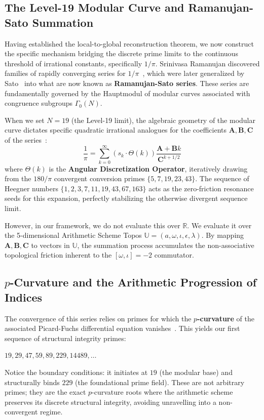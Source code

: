 \subsection{The Level-19 Modular Curve and Ramanujan-Sato Summation}
Having established the local-to-global reconstruction theorem, we now construct the specific mechanism bridging the discrete prime limits to the continuous threshold of irrational constants, specifically $1/\pi$. Srinivasa Ramanujan discovered families of rapidly converging series for $1/\pi$~\cite{Ramanujan1914}, which were later generalized by Sato~\cite{Sato2002} into what are now known as \textbf{Ramanujan-Sato series}. These series are fundamentally governed by the Hauptmodul of modular curves associated with congruence subgroups $\Gamma_0(N)$.

When we set $N=19$ (the Level-19 limit), the algebraic geometry of the modular curve dictates specific quadratic irrational analogues for the coefficients $\mathbf{A}, \mathbf{B}, \mathbf{C}$ of the series~\cite{Campbell2026}:
\begin{equation}
\frac{1}{\pi} = \sum_{k=0}^{\infty} \left( s_k \cdot \Theta(k) \right) \frac{\mathbf{A} + \mathbf{B}k}{\mathbf{C}^{k+1/2}}
\end{equation}
where $\Theta(k)$ is the \textbf{Angular Discretization Operator}, iteratively drawing from the $180/\pi$ convergent conversion primes $\{5, 7, 19, 23, 43\}$. The sequence of Heegner numbers $\{1, 2, 3, 7, 11, 19, 43, 67, 163\}$ acts as the zero-friction resonance seeds for this expansion, perfectly stabilizing the otherwise divergent sequence limit.

However, in our framework, we do not evaluate this over $\mathbb{R}$. We evaluate it over the 5-dimensional Arithmetic Scheme Topos $\mathbb{U} = (a, \omega, \iota, \epsilon, \lambda)$. By mapping $\mathbf{A}, \mathbf{B}, \mathbf{C}$ to vectors in $\mathbb{U}$, the summation process accumulates the non-associative topological friction inherent to the $[\omega, \iota] = -2$ commutator.

\subsection{$p$-Curvature and the Arithmetic Progression of Indices}
The convergence of this series relies on primes for which the \textbf{$p$-curvature} of the associated Picard-Fuchs differential equation vanishes~\cite{Katz1970}. This yields our first sequence of structural integrity primes:
\begin{center}
$19, 29, 47, 59, 89, 229, 14489, \dots$
\end{center}
Notice the boundary conditions: it initiates at $19$ (the modular base) and structurally binds $229$ (the foundational prime field). These are not arbitrary primes; they are the exact $p$-curvature roots where the arithmetic scheme preserves its discrete structural integrity, avoiding unravelling into a non-convergent regime.

